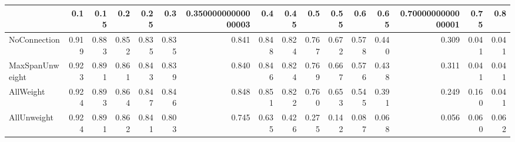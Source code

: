 \begin{tabular}{lrrrrrrrrrrrrrrr}
\toprule
{} &   0.1 &  0.15 &   0.2 &  0.25 &   0.3 & 0.35000000000000003 &   0.4 &  0.45 &   0.5 &  0.55 &   0.6 &  0.65 & 0.7000000000000001 &  0.75 &   0.8 \\
\midrule
NoConnection    & 0.919 & 0.883 & 0.852 & 0.835 & 0.835 &               0.841 & 0.848 & 0.824 & 0.767 & 0.672 & 0.578 & 0.440 &              0.309 & 0.041 & 0.041 \\
MaxSpanUnweight & 0.923 & 0.891 & 0.861 & 0.843 & 0.839 &               0.840 & 0.846 & 0.824 & 0.769 & 0.667 & 0.576 & 0.438 &              0.311 & 0.041 & 0.041 \\
AllWeight       & 0.924 & 0.893 & 0.864 & 0.847 & 0.846 &               0.848 & 0.851 & 0.822 & 0.760 & 0.653 & 0.545 & 0.391 &              0.249 & 0.160 & 0.041 \\
AllUnweight     & 0.924 & 0.891 & 0.862 & 0.841 & 0.803 &               0.745 & 0.635 & 0.426 & 0.275 & 0.142 & 0.087 & 0.068 &              0.056 & 0.060 & 0.062 \\
\bottomrule
\end{tabular}
